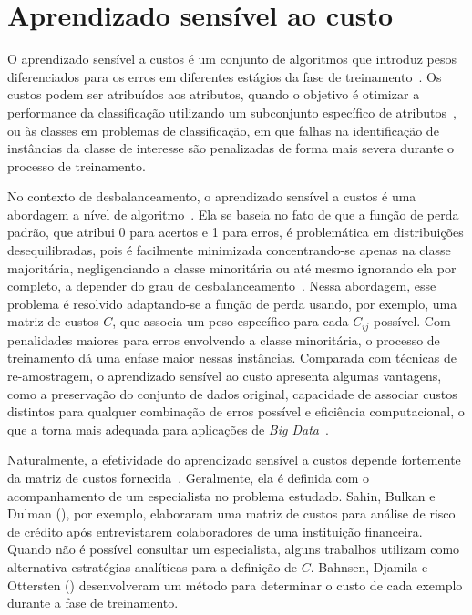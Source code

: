 \section{Aprendizado sensível ao custo}

O aprendizado sensível a custos é um conjunto de algoritmos que introduz pesos diferenciados para os erros em diferentes estágios da fase de treinamento~\cite{FernndezCs2018}. Os custos podem ser atribuídos aos atributos, quando o objetivo é otimizar a performance da classificação utilizando um subconjunto específico de atributos~\cite{Zhou2016}, ou às classes em problemas de classificação, em que falhas na identificação de instâncias da classe de interesse são penalizadas de forma mais severa durante o processo de treinamento.

No contexto de desbalanceamento, o aprendizado sensível a custos é uma abordagem a nível de algoritmo~\cite{Krawczyk2016}. Ela se baseia no fato de que a função de perda padrão, que atribui 0 para acertos e 1 para erros, é problemática em distribuições desequilibradas, pois é facilmente minimizada concentrando-se apenas na classe majoritária, negligenciando a classe minoritária ou até mesmo ignorando ela por completo, a depender do grau de desbalanceamento~\cite{Landgrebe2004}. Nessa abordagem, esse problema é resolvido adaptando-se a função de perda usando, por exemplo, uma matriz de custos \(C\), que associa um peso específico para cada \(C_{ij}\) possível. Com penalidades maiores para erros envolvendo a classe minoritária, o processo de treinamento dá uma enfase maior nessas instâncias. Comparada com técnicas de re-amostragem, o aprendizado sensível ao custo apresenta algumas vantagens, como a preservação do conjunto de dados original, capacidade de associar custos distintos para qualquer combinação de erros possível e eficiência computacional, o que a torna mais adequada para aplicações de \textit{Big Data}~\cite{Haixiang2017}.

Naturalmente, a efetividade do aprendizado sensível a custos depende fortemente da matriz de custos fornecida~\cite{FernndezCs2018}. Geralmente, ela é definida com o acompanhamento de um especialista no problema estudado. Sahin, Bulkan e Dulman (\citeyear{Sahin2013}), por exemplo, elaboraram uma matriz de custos para análise de risco de crédito após entrevistarem colaboradores de uma instituição financeira. Quando não é possível consultar um especialista, alguns trabalhos utilizam como alternativa estratégias analíticas para a definição de \(C\). Bahnsen, Djamila e Ottersten (\citeyear{Bahnsen2015}) desenvolveram um método para determinar o custo de cada exemplo durante a fase de treinamento.

